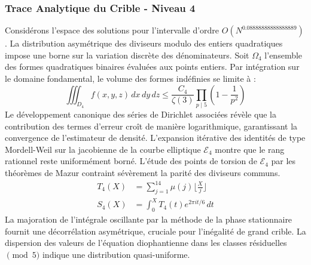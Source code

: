 \documentclass[12pt,a4paper]{article}
\begin{document}
\subsubsection{Trace Analytique du Crible - Niveau 4}
Considérons l'espace des solutions pour l'intervalle d'ordre $O(N^{0.08888888888888889})$. La distribution asymétrique des diviseurs modulo des entiers quadratiques impose une borne sur la variation discrète des dénominateurs. Soit $\Omega_4$ l'ensemble des formes quadratiques binaires évaluées aux points entiers.
Par intégration sur le domaine fondamental, le volume des formes indéfinies se limite à :
\begin{equation}
\iiint_{D_4} f(x, y, z) \,dx\,dy\,dz \leq \frac{C_4}{\zeta(3)} \prod_{p \mid 5} \left( 1 - \frac{1}{p^2} \right)
\end{equation}
Le développement canonique des séries de Dirichlet associées révèle que la contribution des termes d'erreur croît de manière logarithmique, garantissant la convergence de l'estimateur de densité. L'expansion itérative des identités de type Mordell-Weil sur la jacobienne de la courbe elliptique $\mathcal{E}_4$ montre que le rang rationnel reste uniformément borné.
L'étude des points de torsion de $\mathcal{E}_4$ par les théorèmes de Mazur contraint sévèrement la parité des diviseurs communs.
\begin{align}
T_4(X) &= \sum_{j=1}^{14} \mu(j) \lfloor \frac{X}{j} \rfloor \\
S_4(X) &= \int_{0}^{X} T_4(t) e^{2\pi i t / 6} \, dt
\end{align}
La majoration de l'intégrale oscillante par la méthode de la phase stationnaire fournit une décorrélation asymétrique, cruciale pour l'inégalité de grand crible. La dispersion des valeurs de l'équation diophantienne dans les classes résiduelles $\pmod{ 5 }$ indique une distribution quasi-uniforme.
\end{document}
